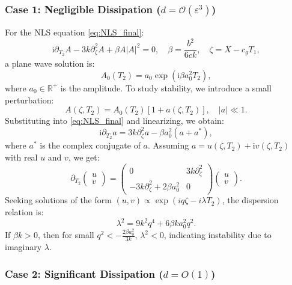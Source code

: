 \documentclass[alpha-refs, 12pt]{wiley-article}
\renewcommand{\O}{\mathcal{O}}
\newcommand{\ui}{\mathrm{i}}
\newcommand{\eps}{\varepsilon}
\begin{document}
\subsubsection*{Case 1: Negligible Dissipation ($d = \O(\eps^3)$)}

For the NLS equation \eqref{eq:NLS_final}:
\[
  \ui \partial_{T_2} A - 3 k \partial_\zeta^2 A + \beta A |A|^2 = 0, \quad \beta = \frac{b^2}{6 c k}, \quad \zeta = X - c_g T_1,
\]
a plane wave solution is:
\begin{equation}\label{eq:plane_wave_case1}
  A_0(T_2) = a_0 \exp(\ui \beta a_0^2 T_2),
\end{equation}
where $a_0 \in \mathbb{R}^+$ is the amplitude. To study stability, we introduce a small perturbation:
\begin{equation}\label{eq:perturbation_case1}
  A(\zeta, T_2) = A_0(T_2) [1 + a(\zeta, T_2)], \quad |a| \ll 1.
\end{equation}
Substituting into \eqref{eq:NLS_final} and linearizing, we obtain:
\begin{equation}\label{eq:linearized_case1}
  \ui \partial_{T_2} a = 3 k \partial_{\zeta}^2 a - \beta a_0^2 (a + a^*),
\end{equation}
where $a^*$ is the complex conjugate of $a$. Assuming $a = u(\zeta, T_2) + \ui v(\zeta, T_2)$ with real $u$ and $v$, we get:
\begin{equation}\label{eq:matrix_case1}
  \partial_{T_2} \begin{pmatrix} u \\ v \end{pmatrix} = \begin{pmatrix}
0 & 3 k \partial_\zeta^2 \\
-3 k \partial_\zeta^2 + 2 \beta a_0^2 & 0
\end{pmatrix} \begin{pmatrix} u \\ v \end{pmatrix}.
\end{equation}
Seeking solutions of the form $(u, v) \propto \exp(i q \zeta - i \lambda T_2)$, the dispersion relation is:
\begin{equation}\label{eq:dispersion_case1}
  \lambda^2 = 9 k^2 q^4 + 6 \beta k a_0^2 q^2.
\end{equation}
If $\beta k > 0$, then for small $q^2 < -\frac{2 \beta a_0^2}{3 k}$, $\lambda^2 < 0$, indicating instability due to imaginary $\lambda$.

\subsubsection*{Case 2: Significant Dissipation ($d = O(1)$)}
\end{document}
